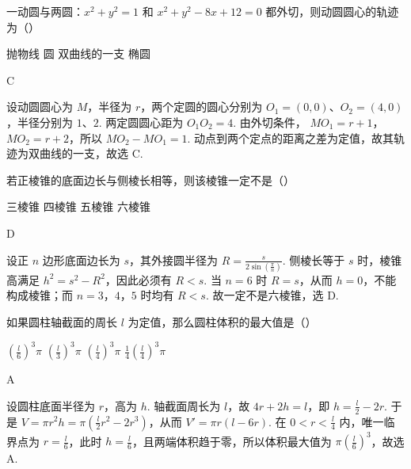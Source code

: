 \documentclass[UTF8,a4paper,oneside,11pt]{ctexbook}
\begin{document}
\begin{problem}
一动圆与两圆：\(x^{2} + y^{2} = 1\) 和 \(x^{2} + y^{2} - 8x + 12 = 0\) 都外切，则动圆圆心的轨迹为（\quad）

\choices
    {抛物线}
    {圆}
    {双曲线的一支}
    {椭圆}
\end{problem}

\begin{answer}
C
\end{answer}

\begin{solution}
设动圆圆心为 \(M\)，半径为 \(r\)，两个定圆的圆心分别为
\(O_1=(0,0)\)、\(O_2=(4,0)\)，半径分别为 \(1\)、\(2\). 两定圆圆心距为
\(O_1O_2=4\). 由外切条件，
\(MO_1=r+1\)，\(MO_2=r+2\)，所以
\(MO_2-MO_1=1\). 动点到两个定点的距离之差为定值，故其轨迹为双曲线的一支，故选 C.
\end{solution}

\begin{problem}
若正棱锥的底面边长与侧棱长相等，则该棱锥一定不是（\quad）

\choices
    {三棱锥}
    {四棱锥}
    {五棱锥}
    {六棱锥}
\end{problem}

\begin{answer}
D
\end{answer}

\begin{solution}
设正 \(n\) 边形底面边长为 \(s\)，其外接圆半径为
\(R=\frac{s}{2\sin(\frac{\pi}{n})}\). 侧棱长等于 \(s\) 时，棱锥高满足
\(h^2=s^2-R^2\)，因此必须有 \(R<s\). 当 \(n=6\) 时
\(R=s\)，从而 \(h=0\)，不能构成棱锥；而 \(n=3\)，\(4\)，\(5\) 时均有 \(R<s\). 故一定不是六棱锥，选 D.
\end{solution}

\begin{problem}
如果圆柱轴截面的周长 \(l\) 为定值，那么圆柱体积的最大值是（\quad）

\choices
    {\(\left(\frac{l}{6}\right)^3\pi\)}
    {\(\left(\frac{l}{3}\right)^3\pi\)}
    {\(\left(\frac{l}{4}\right)^3\pi\)}
    {\(\frac{1}{4}\left(\frac{l}{4}\right)^3\pi\)}
\end{problem}

\begin{answer}
A
\end{answer}

\begin{solution}
设圆柱底面半径为 \(r\)，高为 \(h\). 轴截面周长为 \(l\)，故
\(4r+2h=l\)，即 \(h=\frac{l}{2}-2r\). 于是
\(V=\pi r^2h=\pi\left(\frac{l}{2}r^2-2r^3\right)\)，从而
\(V'=\pi r(l-6r)\).
在 \(0<r<\frac{l}{4}\) 内，唯一临界点为 \(r=\frac{l}{6}\)，此时
\(h=\frac{l}{6}\)，且两端体积趋于零，所以体积最大值为
\(\pi\left(\frac{l}{6}\right)^3\)，故选 A.
\end{solution}
\end{document}
